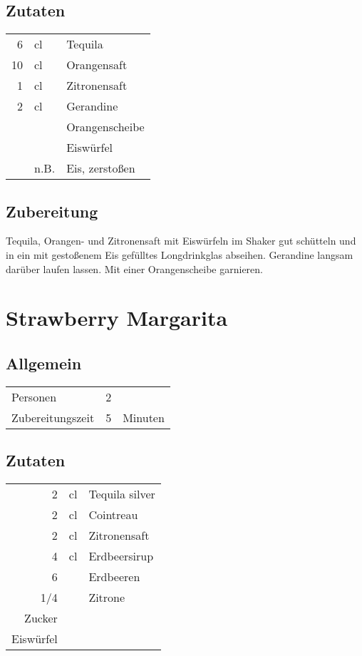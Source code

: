 \subsection*{Zutaten}
\begin{tabular}{rll}
	6  &   cl & Tequila\index{Tequila} \\
	10 &   cl &            Orangensaft \\
	1  &   cl &           Zitronensaft \\
	2  &   cl &              Gerandine \\
	   &      &         Orangenscheibe \\
	   &      &              Eiswürfel \\
	   & n.B. &         Eis, zerstoßen
\end{tabular} 

\subsection*{Zubereitung}
Tequila, Orangen- und Zitronensaft mit  Eiswürfeln im Shaker gut schütteln und in ein mit gestoßenem Eis gefülltes Longdrinkglas abseihen. Gerandine langsam darüber laufen lassen. Mit einer Orangenscheibe garnieren.

\section{Strawberry Margarita} 
\subsection*{Allgemein}
\begin{tabular}{lrl}
	Personen         & 2 &  \\
	Zubereitungszeit & 5 & Minuten
\end{tabular} 
	\subsection*{Zutaten}
	\begin{tabular}{rll}
		        2 & cl & Tequila silver \\
		        2 & cl & Cointreau      \\
		        2 & cl & Zitronensaft   \\
		        4 & cl & Erdbeersirup   \\
		        6 &    & Erdbeeren      \\
		      1/4 &    & Zitrone        \\
		   Zucker &    &  \\
		Eiswürfel &    &
	\end{tabular} 

